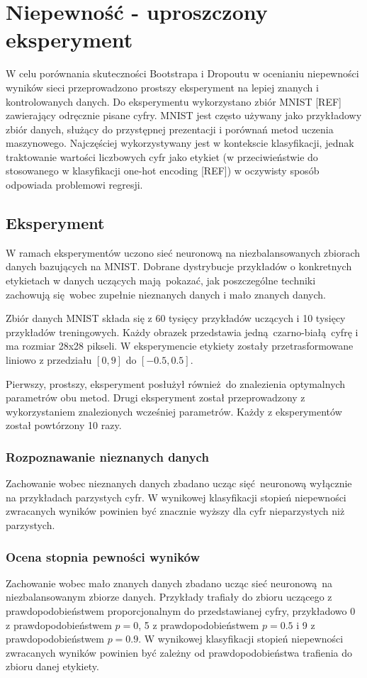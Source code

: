 \section{Niepewność - uproszczony eksperyment}
W celu porównania skuteczności Bootstrapa i Dropoutu w ocenianiu niepewności wyników sieci przeprowadzono prostszy eksperyment na lepiej znanych i kontrolowanych danych. Do eksperymentu wykorzystano zbiór MNIST [REF] zawierający odręcznie pisane cyfry. MNIST jest często używany jako przykładowy zbiór danych, służący do przystępnej prezentacji i porównań metod uczenia maszynowego. Najczęściej wykorzystywany jest w kontekscie klasyfikacji, jednak traktowanie wartości liczbowych cyfr jako etykiet (w przeciwieństwie do stosowanego w klasyfikacji one-hot encoding [REF]) w oczywisty sposób odpowiada problemowi regresji.    

\subsection{Eksperyment}
W ramach eksperymentów uczono sieć neuronową na niezbalansowanych zbiorach danych bazujących na MNIST. Dobrane dystrybucje przykładów o konkretnych etykietach w danych uczących mają pokazać, jak poszczególne techniki zachowują się wobec zupełnie nieznanych danych i mało znanych danych.

Zbiór danych MNIST składa się z 60 tysięcy przykładów uczących i 10 tysięcy przykładów treningowych. Każdy obrazek przedstawia jedną czarno-białą cyfrę i ma rozmiar 28x28 pikseli. W eksperymencie etykiety zostały przetrasformowane liniowo z przedziału $[0,9]$ do $[-0.5,0.5]$.

Pierwszy, prostszy, eksperyment posłużył również do znalezienia optymalnych parametrów obu metod. Drugi eksperyment został przeprowadzony z wykorzystaniem znalezionych wcześniej parametrów. Każdy z eksperymentów został powtórzony 10 razy.

\subsubsection{Rozpoznawanie nieznanych danych}
Zachowanie wobec nieznanych danych zbadano ucząc sięć neuronową wyłącznie na przykładach parzystych cyfr. W wynikowej klasyfikacji stopień niepewności zwracanych wyników powinien być znacznie wyższy dla cyfr nieparzystych niż parzystych.


\subsubsection{Ocena stopnia pewności wyników}
Zachowanie wobec mało znanych danych zbadano ucząc sieć neuronową na niezbalansowanym zbiorze danych. Przykłady trafiały do zbioru uczącego z prawdopodobieństwem proporcjonalnym do przedstawianej cyfry, przykładowo 0 z prawdopodobieństwem $p=0$, 5 z prawdopodobieństwem $p=0.5$ i 9 z prawdopodobieństwem $p=0.9$. W wynikowej klasyfikacji stopień niepewności zwracanych wyników powinien być zależny od prawdopodobieństwa trafienia do zbioru danej etykiety.

